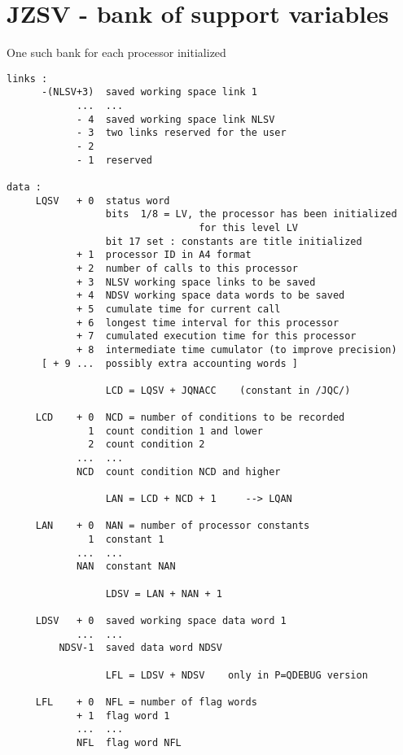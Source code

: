 \section{JZSV - bank of support variables}

One such bank for each processor initialized

\begin{verbatim}
links :
      -(NLSV+3)  saved working space link 1
            ...  ...
            - 4  saved working space link NLSV
            - 3  two links reserved for the user
            - 2
            - 1  reserved

data :
     LQSV   + 0  status word
                 bits  1/8 = LV, the processor has been initialized
                                 for this level LV
                 bit 17 set : constants are title initialized
            + 1  processor ID in A4 format
            + 2  number of calls to this processor
            + 3  NLSV working space links to be saved
            + 4  NDSV working space data words to be saved
            + 5  cumulate time for current call
            + 6  longest time interval for this processor
            + 7  cumulated execution time for this processor
            + 8  intermediate time cumulator (to improve precision)
      [ + 9 ...  possibly extra accounting words ]

                 LCD = LQSV + JQNACC    (constant in /JQC/)

     LCD    + 0  NCD = number of conditions to be recorded
              1  count condition 1 and lower
              2  count condition 2
            ...  ...
            NCD  count condition NCD and higher

                 LAN = LCD + NCD + 1     --> LQAN

     LAN    + 0  NAN = number of processor constants
              1  constant 1
            ...  ...
            NAN  constant NAN

                 LDSV = LAN + NAN + 1

     LDSV   + 0  saved working space data word 1
            ...  ...
         NDSV-1  saved data word NDSV

                 LFL = LDSV + NDSV    only in P=QDEBUG version

     LFL    + 0  NFL = number of flag words
            + 1  flag word 1
            ...  ...
            NFL  flag word NFL
\end{verbatim}

